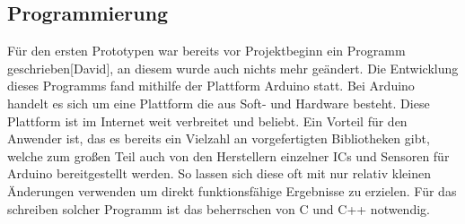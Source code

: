 \subsection{Programmierung} \label{programmierung-1}

Für den ersten Prototypen war bereits vor Projektbeginn ein Programm geschrieben[David], an diesem wurde auch nichts mehr geändert. Die Entwicklung dieses Programms fand mithilfe der Plattform Arduino statt. Bei Arduino handelt es sich um eine Plattform die aus Soft- und Hardware  besteht. Diese Plattform ist im Internet weit verbreitet und beliebt. Ein Vorteil für den Anwender ist, das es bereits ein Vielzahl an vorgefertigten Bibliotheken gibt, welche zum großen Teil auch von den Herstellern einzelner ICs und Sensoren für Arduino bereitgestellt werden. So lassen sich diese oft mit nur relativ kleinen Änderungen verwenden um direkt funktionsfähige Ergebnisse zu erzielen. Für das schreiben solcher Programm ist das beherrschen von C und C++ notwendig.



